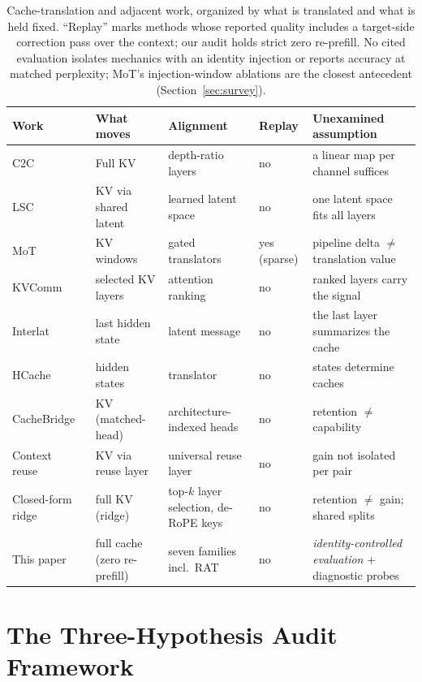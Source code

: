 \documentclass[10pt]{article}
\begin{document}
\begin{table}[t]
\centering
\small
\caption{Cache-translation and adjacent work, organized by what is
translated and what is held fixed. ``Replay'' marks methods whose reported
quality includes a target-side correction pass over the context; our audit
holds strict zero re-prefill. No cited evaluation isolates mechanics with an
identity injection or reports accuracy at matched perplexity; MoT's
injection-window ablations are the closest antecedent
(Section~\ref{sec:survey}).}
\label{tab:related}
\begin{tabular}{p{2.6cm}p{2.2cm}p{2.4cm}p{1.6cm}p{3.4cm}}
\toprule
Work & What moves & Alignment & Replay & Unexamined assumption \\
\midrule
C2C~\citep{c2c2025} & Full KV & depth-ratio layers & no & a linear map per
channel suffices \\
LSC~\citep{lsc2026} & KV via shared latent & learned latent space & no &
one latent space fits all layers \\
MoT~\citep{mot2026} & KV windows & gated translators & yes (sparse) &
pipeline delta $\neq$ translation value \\
KVComm~\citep{kvcomm2025} & selected KV layers & attention ranking & no &
ranked layers carry the signal \\
Interlat~\citep{interlat2025} & last hidden state & latent message & no &
the last layer summarizes the cache \\
HCache~\citep{hcache2025} & hidden states & translator & no & states
determine caches \\
CacheBridge~\citep{cachebridge2026} & KV (matched-head) & architecture-indexed heads & no & retention $\neq$ capability \\
Context reuse~\citep{contextreuse2026} & KV via reuse layer & universal reuse layer & no & gain not isolated per pair \\
\midrule
Closed-form ridge~\citep{heo2026} & full KV (ridge) & top-$k$ layer selection, de-RoPE
keys & no & retention $\neq$ gain; shared splits \\
\midrule
This paper & full cache (zero re-prefill) & seven families incl.\ RAT & no &
\emph{identity-controlled evaluation} + diagnostic probes \\
\bottomrule
\end{tabular}
\end{table}

\section{The Three-Hypothesis Audit Framework}
\label{sec:framework}
\end{document}
